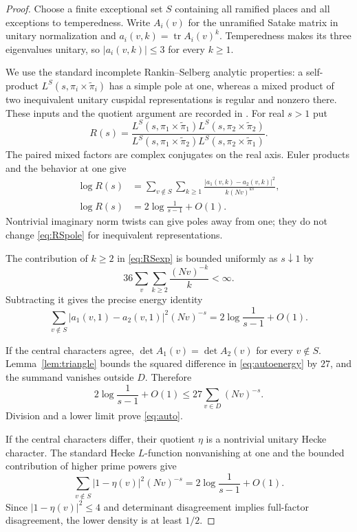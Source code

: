 \documentclass[11pt]{article}
\theoremstyle{definition}\newtheorem{definition}[theorem]{Definition}
\theoremstyle{remark}\newtheorem{remark}[theorem]{Remark}
\newcommand{\tr}{\operatorname{tr}}\newcommand{\Gal}{\operatorname{Gal}}\newcommand{\diag}{\operatorname{diag}}
\begin{document}
\begin{proof}
Choose a finite exceptional set $S$ containing all ramified places and all exceptions to temperedness. Write $A_i(v)$ for the unramified Satake matrix in unitary normalization and
$a_i(v,k)=\tr A_i(v)^k$. Temperedness makes its three eigenvalues unitary, so $|a_i(v,k)|\le3$ for every $k\ge1$.

We use the standard incomplete Rankin--Selberg analytic properties: a self-product $L^S(s,\pi_i\times\widetilde\pi_i)$ has a simple pole at one, whereas a mixed product of two inequivalent unitary cuspidal representations is regular and nonzero there. These inputs and the quotient argument are recorded in \cite[Section 2]{Rajan2003}. For real $s>1$ put
\[
 R(s)=\frac{L^S(s,\pi_1\times\widetilde\pi_1)L^S(s,\pi_2\times\widetilde\pi_2)}
 {L^S(s,\pi_1\times\widetilde\pi_2)L^S(s,\pi_2\times\widetilde\pi_1)}.
\]
The paired mixed factors are complex conjugates on the real axis. Euler products and the behavior at one give
\begin{align}
 \log R(s)
 &=\sum_{v\notin S}\sum_{k\ge1}
 \frac{|a_1(v,k)-a_2(v,k)|^2}{k(Nv)^{ks}},\label{eq:RSexp}\\
 \log R(s)&=2\log\frac1{s-1}+O(1).\label{eq:RSpole}
\end{align}
Nontrivial imaginary norm twists can give poles away from one; they do not change \eqref{eq:RSpole} for inequivalent representations.

The contribution of $k\ge2$ in \eqref{eq:RSexp} is bounded uniformly as $s\downarrow1$ by
\[
 36\sum_v\sum_{k\ge2}\frac{(Nv)^{-k}}k<\infty.
\]
Subtracting it gives the precise energy identity
\begin{equation}\label{eq:autoenergy}
 \sum_{v\notin S}|a_1(v,1)-a_2(v,1)|^2(Nv)^{-s}
 =2\log\frac1{s-1}+O(1).
\end{equation}

If the central characters agree, $\det A_1(v)=\det A_2(v)$ for every $v\notin S$. Lemma~\ref{lem:triangle} bounds the squared difference in \eqref{eq:autoenergy} by $27$, and the summand vanishes outside $D$. Therefore
\[
 2\log\frac1{s-1}+O(1)\le27\sum_{v\in D}(Nv)^{-s}.
\]
Division and a lower limit prove \eqref{eq:auto}.

If the central characters differ, their quotient $\eta$ is a nontrivial unitary Hecke character. The standard Hecke $L$-function nonvanishing at one and the bounded contribution of higher prime powers give
\[
 \sum_{v\notin S}|1-\eta(v)|^2(Nv)^{-s}
 =2\log\frac1{s-1}+O(1).
\]
Since $|1-\eta(v)|^2\le4$ and determinant disagreement implies full-factor disagreement, the lower density is at least $1/2$.


\end{proof}
\end{document}
